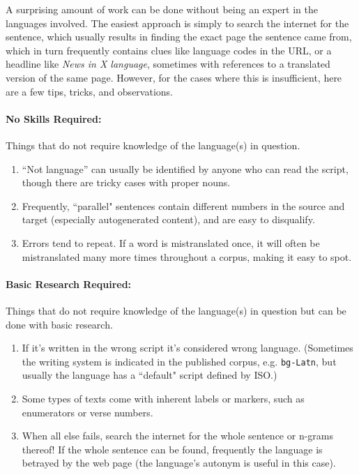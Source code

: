 A surprising amount of work can be done without being an expert in the languages involved. The easiest approach is simply to search the internet for the sentence, which usually results in finding the exact page the sentence came from, which in turn frequently contains clues like language codes in the URL, or a headline like \textit{News in X language}, sometimes with references to a translated version of the same page. However, for the cases where this is insufficient, here are a few tips, tricks, and observations.

\paragraph{No Skills Required:}
Things that do not require knowledge of the language(s) in question.
\begin{enumerate}
    \item ``Not language'' can usually be identified by anyone who can read the script, though there are tricky cases with proper nouns.
    \item Frequently, ``parallel" sentences contain different numbers in the source and target (especially autogenerated content), and are easy to disqualify.
    \item Errors tend to repeat. If a word is mistranslated once, it will often be mistranslated many more times throughout a corpus, making it easy to spot.
\end{enumerate}

\paragraph{Basic Research Required:}
Things that do not require knowledge of the language(s) in question but can be done with basic research.
\begin{enumerate}
    \item If it's written in the wrong script it's considered wrong language. (Sometimes the writing system is indicated in the published corpus, e.g. \texttt{bg-Latn}, but usually the language has a ``default" script defined by ISO.)
    \item Some types of texts come with inherent labels or markers, such as enumerators or verse numbers.
    \item When all else fails, search the internet for the whole sentence or n-grams thereof! If the whole sentence can be found, frequently the language is betrayed by the web page (the language's autonym is useful in this case).
\end{enumerate}


